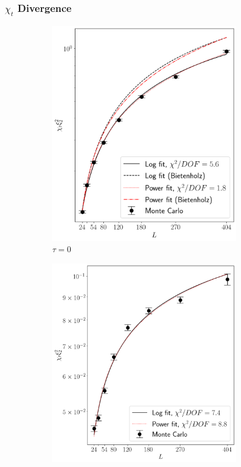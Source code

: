 \documentclass{beamer}
\begin{document}
\begin{frame}
    \frametitle{$\chi_t$ Divergence}
    \begin{figure}[h!]
        \begin{center}
          \begin{subfigure}[b]{0.45\paperwidth}

              \centering
              \includegraphics[width=0.9\textwidth]{imgs/divergence.png}
              \caption{$\tau = 0$}
          \end{subfigure}%
          \begin{subfigure}[b]{0.45\paperwidth}
              \centering
              \includegraphics[width=0.9\textwidth]{imgs/divergence_flowed.png}

\end{subfigure}
\end{center}
\end{figure}
\end{frame}
\end{document}
